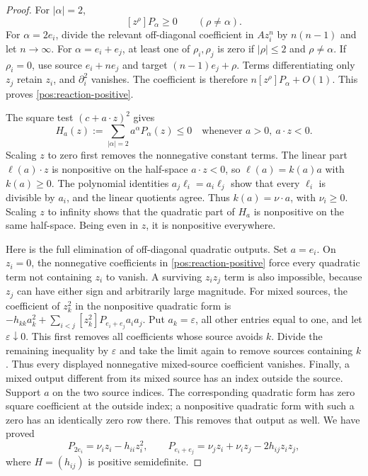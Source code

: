 \documentclass[reqno]{amsart}
\theoremstyle{definition}
\theoremstyle{remark}
\begin{document}
\begin{proof}
For \(|\alpha|=2\),
\begin{equation}\label{pos:reaction-positive}
 [z^\rho]P_\alpha\ge0\qquad(\rho\ne\alpha).
\end{equation}
For \(\alpha=2e_i\), divide the relevant off-diagonal coefficient in \(Az_i^n\)
by \(n(n-1)\) and let \(n\to\infty\).  For \(\alpha=e_i+e_j\), at least one of
\(\rho_i,\rho_j\) is zero if \(|\rho|\le2\) and \(\rho\ne\alpha\).
If \(\rho_i=0\), use source \(e_i+ne_j\) and target \((n-1)e_j+\rho\).
Terms differentiating only \(z_j\) retain \(z_i\), and \(\partial_i^2\) vanishes.
The coefficient is therefore \(n[z^\rho]P_\alpha+O(1)\).  This proves
\eqref{pos:reaction-positive}.

The square test \((c+a\cdot z)^2\) gives
\[
 H_a(z):=\sum_{|\alpha|=2}a^\alpha P_\alpha(z)\le0
 \quad\text{whenever }a>0,\ a\cdot z<0.
\]
Scaling \(z\) to zero first removes the nonnegative constant terms.
The linear part \(\ell(a)\cdot z\) is nonpositive on the half-space
\(a\cdot z<0\), so \(\ell(a)=k(a)a\) with \(k(a)\ge0\).
The polynomial identities \(a_j\ell_i=a_i\ell_j\) show that every \(\ell_i\)
is divisible by \(a_i\), and the linear quotients agree.  Thus
\(k(a)=\nu\cdot a\), with \(\nu_i\ge0\).
Scaling \(z\) to infinity shows that the quadratic part of \(H_a\) is nonpositive
on the same half-space.  Being even in \(z\), it is nonpositive everywhere.

Here is the full elimination of off-diagonal quadratic outputs.  Set \(a=e_i\).
On \(z_i=0\), the nonnegative coefficients in \eqref{pos:reaction-positive}
force every quadratic term not containing \(z_i\) to vanish.  A surviving
\(z_i z_j\) term is also impossible, because \(z_j\) can have either sign and
arbitrarily large magnitude.  For mixed sources, the coefficient of \(z_k^2\)
in the nonpositive quadratic form is
\(-h_{kk}a_k^2+\sum_{i<j}[z_k^2]P_{e_i+e_j}a_i a_j\).
Put \(a_k=\varepsilon\), all other entries equal to one, and let
\(\varepsilon\downarrow0\).  This first removes all coefficients whose
source avoids \(k\).  Divide the remaining inequality by \(\varepsilon\)
and take the limit again to remove sources containing \(k\).  Thus every
displayed nonnegative mixed-source coefficient vanishes.  Finally, a mixed output different from its mixed source
has an index outside the source.  Support \(a\) on the two source indices.
The corresponding quadratic form has zero square coefficient at the outside
index; a nonpositive quadratic form with such a zero has an identically zero
row there.  This removes that output as well.  We have proved
\[
 P_{2e_i}=\nu_i z_i-h_{ii}z_i^2,\qquad
 P_{e_i+e_j}=\nu_jz_i+\nu_i z_j-2h_{ij}z_i z_j,
\]
where \(H=(h_{ij})\) is positive semidefinite.


\end{proof}
\end{document}
